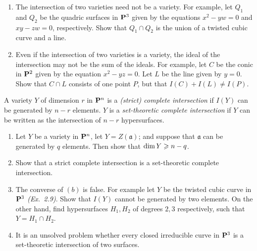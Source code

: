 \documentclass[10pt]{amsart}
\begin{document}
\begin{solution}
    
\end{solution}

\begin{exercise}[2.16]
    \begin{enumerate}
        \item The intersection of two varieties need not be a variety. For example,
        let $Q_1$ and $Q_2$ be the quadric surfaces in ${\bf P}^3$ given by the
        equations $x^2-yw = 0$ and $xy - zw =0$, respectively. Show that $Q_1 \cap
        Q_2$ is the union of a twisted cubic curve and a line.
        
        \item Even if the intersection of two varieties is a variety, the ideal of the
        intersection may not be the sum of the ideals. For example, let $C$ be the
        conic in ${\bf P}^2$ given by the equation $x^2-yz = 0$. Let $L$ be the line
        given by $y = 0$. Show that $C \cap L$ consists of one point $P$, but that
        $I(C) + I(L) \ne I(P)$. 
    \end{enumerate}
\end{exercise}

\begin{solution}
    
\end{solution}

\begin{exercise}[2.17]
    A variety $Y$ of dimension $r$ in ${\bf P}^n$ is a \emph{(strict) complete
    intersection} if $I(Y)$ can be generated by $n-r$ elements. $Y$ is a
    \emph{set-theoretic complete intersection} if $Y$ can be written as the
    intersection of $n-r$ hypersurfaces.
    \begin{enumerate}
    \item Let $Y$ be a variety in ${\bf P}^n$, let $Y = Z(\mathfrak{a})$; and
    suppose that $\mathfrak{a}$ can be generated by $q$ elements. Then show
    that $\operatorname{\rm{dim}} Y \geqslant n-q$. 
    \item Show that a strict complete intersection is a set-theoretic complete
    intersection.
    \item The converse of $(b)$ is false. For example let $Y$ be the twisted
    cubic curve in ${\bf P}^3$ {\emph{(Ex.\ 2.9)}}. Show that
    $I(Y)$ cannot be generated by two elements. On the other hand, find
    hypersurfaces $H_1,H_2$ of degrees $2,3$ respectively, such that
    $Y = H_1 \cap H_2$. 
    \item It is an unsolved problem whether every closed irreducible curve in
    ${\bf P}^3$ is a set-theoretic intersection of two surfaces.
    \end{enumerate}
\end{exercise}
\end{document}
